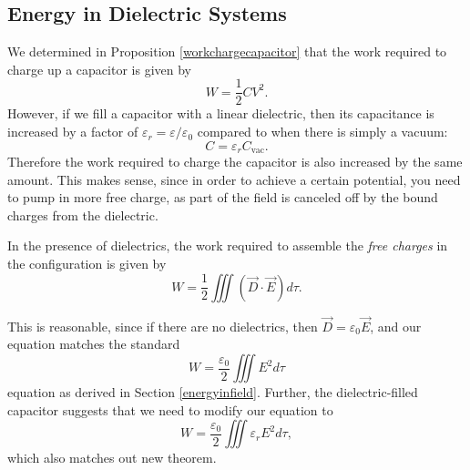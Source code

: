 \subsection{Energy in Dielectric Systems}

We determined in Proposition \ref{workchargecapacitor} that the work required to charge up a capacitor is given by
\[W=\frac{1}{2}CV^2.\]
However, if we fill a capacitor with a linear dielectric, then its capacitance is increased by a factor of $\varepsilon_r=\varepsilon/\varepsilon_0$ compared to when there is simply a vacuum:
\[C=\varepsilon_r C_\text{vac}.\]
Therefore the work required to charge the capacitor is also increased by the same amount. This makes sense, since in order to achieve a certain potential, you need to pump in more free charge, as part of the field is canceled off by the bound charges from the dielectric.

\begin{theorem}\label{dielectricsworkfield}
In the presence of dielectrics, the work required to assemble the \textit{free charges} in the configuration is given by
\[W=\frac{1}{2}\iiint (\vec{D}\cdot\vec{E}) d\tau.\]
\end{theorem}

\begin{remark}
This is reasonable, since if there are no dielectrics, then $\vec{D}=\varepsilon_0\vec{E}$, and our equation matches the standard
\[W=\frac{\varepsilon_0}{2}\iiint E^2 d\tau\]
equation as derived in Section \ref{energyinfield}. Further, the dielectric-filled capacitor suggests that we need to modify our equation to
\[W=\frac{\varepsilon_0}{2}\iiint \varepsilon_r E^2 d\tau,\]
which also matches out new theorem.
\end{remark}

